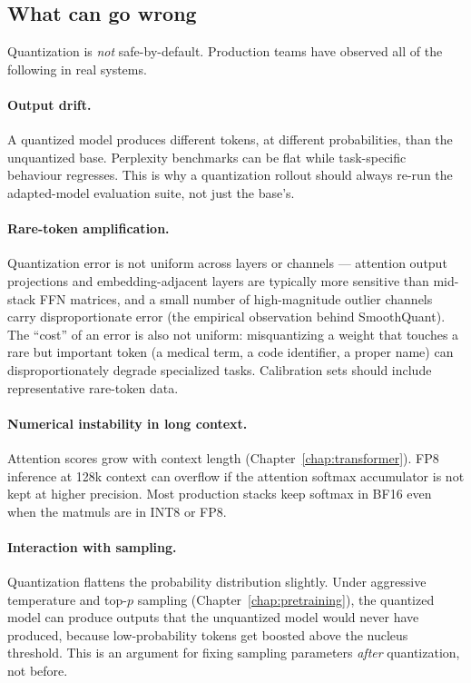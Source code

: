 \subsection{What can go wrong}

Quantization is \emph{not} safe-by-default. Production teams
have observed all of the following in real systems.

\paragraph{Output drift.}
A quantized model produces different tokens, at different
probabilities, than the unquantized base. Perplexity benchmarks can
be flat while task-specific behaviour regresses. This is why a
quantization rollout should always re-run the adapted-model
evaluation suite, not just the base's.

\paragraph{Rare-token amplification.}
Quantization error is not uniform across layers or channels ---
attention output projections and embedding-adjacent layers are
typically more sensitive than mid-stack FFN matrices, and a small
number of high-magnitude outlier channels carry disproportionate
error (the empirical observation behind SmoothQuant). The
``cost'' of an error is also not uniform: misquantizing a weight
that touches a rare but important token (a medical term, a code
identifier, a proper name) can
disproportionately degrade specialized tasks. Calibration sets
should include representative rare-token data.

\paragraph{Numerical instability in long context.}
Attention scores grow with context length (Chapter~\ref{chap:transformer}). FP8 inference
at 128k context can overflow if the attention softmax accumulator
is not kept at higher precision. Most production stacks keep
softmax in BF16 even when the matmuls are in INT8 or FP8.

\paragraph{Interaction with sampling.}
Quantization flattens the probability distribution slightly. Under
aggressive temperature and top-$p$ sampling (Chapter~\ref{chap:pretraining}), the quantized
model can produce outputs that the unquantized model would never
have produced, because low-probability tokens get boosted above the
nucleus threshold. This is an argument for fixing sampling
parameters \emph{after} quantization, not before.

